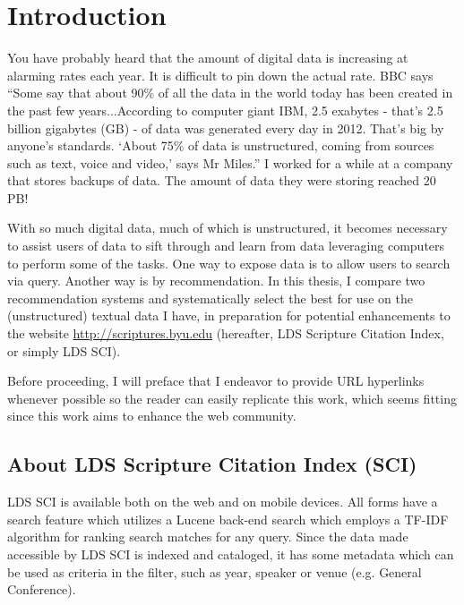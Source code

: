 \chapter{Introduction}
You have probably heard that the amount of digital data is increasing at alarming rates each year. It is difficult to pin down the actual rate. BBC says ``Some say that about 90\% of all the data in the world today has been created in the past few years...According to computer giant IBM, 2.5 exabytes - that's 2.5 billion gigabytes (GB) - of data was generated every day in 2012. That's big by anyone's standards. ‘About 75\% of data is unstructured, coming from sources such as text, voice and video,’ says Mr Miles.'' I worked for a while at a company that stores backups of data. The amount of data they were storing reached 20 PB!

With so much digital data, much of which is unstructured, it becomes necessary to assist users of data to sift through and learn from data leveraging computers to perform some of the tasks. One way to expose data is to allow users to search via query. Another way is by recommendation. In this thesis, I compare two recommendation systems and systematically select the best for use on the (unstructured) textual data I have, in preparation for potential enhancements to the website \url{http://scriptures.byu.edu} (hereafter, LDS Scripture Citation Index, or simply LDS SCI).

Before proceeding, I will preface that I endeavor to provide URL hyperlinks whenever possible so the reader can easily replicate this work, which seems fitting since this work aims to enhance the web community.

\section{About LDS Scripture Citation Index (SCI)}
LDS SCI is available both on the web and on mobile devices. All forms have a search feature which utilizes a Lucene \citep{lucene:luke} back-end search which employs a TF-IDF algorithm for ranking search matches for any query. Since the data made accessible by LDS SCI is indexed and cataloged, it has some metadata which can be used as criteria in the filter, such as year, speaker or venue (e.g. General Conference).

